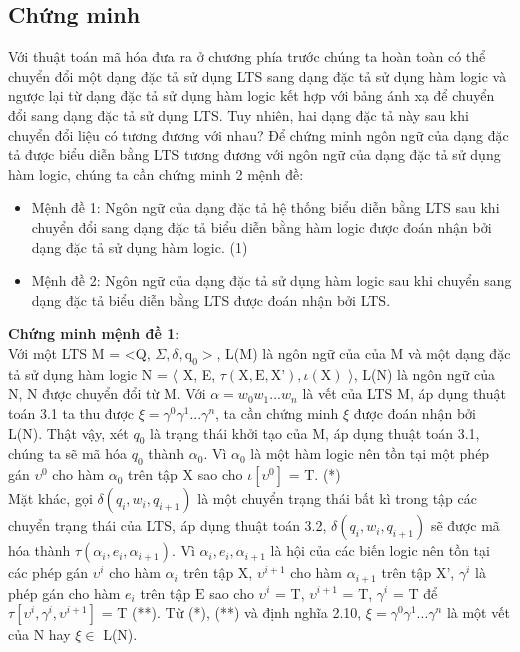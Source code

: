 \documentclass[a4paper,13pt,oneside,openany]{book}
\begin{document}
\begin{flushleft}
		\section{Chứng minh}
		Với thuật toán mã hóa đưa ra ở chương phía trước chúng ta hoàn toàn có thể chuyển đổi một dạng đặc tả sử dụng LTS sang dạng đặc tả sử dụng hàm logic và ngược lại từ dạng đặc tả sử dụng hàm logic kết hợp với bảng ánh xạ để chuyển đổi sang dạng đặc tả sử dụng LTS. Tuy nhiên, hai dạng đặc tả này sau khi chuyển đổi liệu có tương đương với nhau?
		Để chứng minh ngôn ngữ của dạng đặc tả được biểu diễn bằng LTS tương đương với ngôn ngữ của dạng đặc tả sử dụng hàm logic, chúng ta cần chứng minh 2 mệnh đề:
		\begin{itemize}
			\item Mệnh đề 1: Ngôn ngữ của dạng đặc tả hệ thống biểu diễn bằng LTS sau khi chuyển đổi sang dạng đặc tả biểu diễn bằng hàm logic được đoán nhận bởi dạng đặc tả sử dụng hàm logic. (1)\\
			\item Mệnh đề 2: Ngôn ngữ của dạng đặc tả sử dụng hàm logic sau khi chuyển sang dạng đặc tả biểu diễn bằng LTS được đoán nhận bởi LTS.
		\end{itemize}
		\textbf{Chứng minh mệnh đề 1}:\\
		Với một LTS M = <Q, $\Sigma, \delta, \textrm{q}_0>$, L(M) là ngôn ngữ của của M và một dạng đặc tả sử dụng hàm logic N = $\langle$ X, E, $\tau(\textrm{X}, \textrm{E}, \textrm{X'}), \iota(\textrm{X})$ $\rangle$, L(N) là ngôn ngữ của N, N được chuyển đổi từ M.
		Với $\alpha = w_0w_1...w_n$ là vết của LTS M, áp dụng thuật toán 3.1 ta thu được $\xi = \gamma^0\gamma^1...\gamma^n$, ta cần chứng minh $\xi$ được đoán nhận bởi L(N). Thật vậy, xét $q_0$ là trạng thái khởi tạo của M, áp dụng thuật toán 3.1, chúng ta sẽ mã hóa $q_0$ thành $\alpha_0$. Vì $\alpha_0$ là một hàm logic nên tồn tại một phép gán $\upsilon^0$ cho hàm $\alpha_0$ trên tập X sao cho $\iota[\upsilon^0]$ = T. (*)\\
		Mặt khác, gọi $\delta(q_i, w_i, q_{i+1})$ là một chuyển trạng thái bất kì trong tập các chuyển trạng thái của LTS, áp dụng thuật toán 3.2, $\delta(q_i, w_i, q_{i+1})$ sẽ được mã hóa thành $\tau(\alpha_i, e_i,  \alpha_{i+1})$. Vì $\alpha_i, e_i, \alpha_{i+1}$ là hội của các biến logic nên tồn tại các phép gán $\upsilon^i$ cho hàm $\alpha_i$ trên tập $\textrm{X}$, $\upsilon^{i+1}$ cho hàm $\alpha_{i+1}$ trên tập $\textrm{X'}$, $\gamma^i$ là phép gán cho hàm $e_i$ trên tập $\textrm{E}$ sao cho $\upsilon^i$ = T, $\upsilon^{i+1}$ = T, $\gamma^i$ = T để $\tau[\upsilon^i, \gamma^i, \upsilon^{i+1}]$ = T (**). Từ (*), (**) và định nghĩa 2.10, $\xi = \gamma^0\gamma^1...\gamma^n$ là một vết của N hay $\xi \in$ L(N).\\

\end{flushleft}
\end{document}
